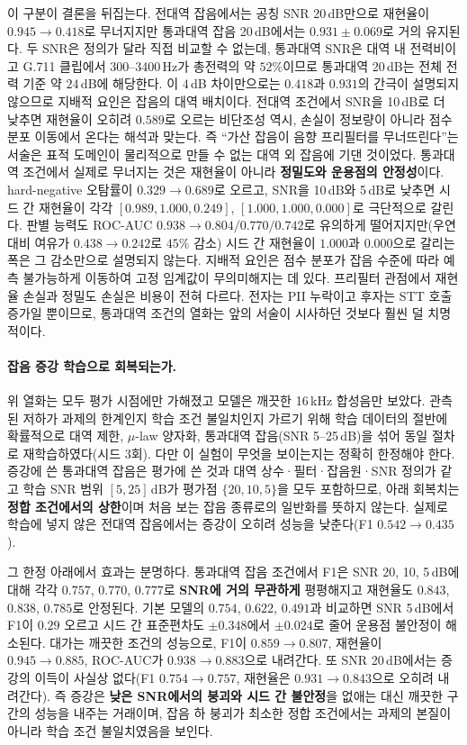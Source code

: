 \documentclass[10pt,twocolumn]{article}
\renewcommand{\emph}[1]{\textbf{#1}}
\begin{document}
이 구분이 결론을 뒤집는다. 전대역 잡음에서는 공칭 SNR 20\,dB만으로 재현율이 $0.945\to0.418$로
무너지지만 통과대역 잡음 20\,dB에서는 $0.931\pm0.069$로 거의 유지된다. 두 SNR은 정의가 달라 직접
비교할 수 없는데, 통과대역 SNR은 대역 내 전력비이고 G.711 클립에서 300--3400\,Hz가 총전력의 약
$52\%$이므로 통과대역 20\,dB는 전체 전력 기준 약 $24$\,dB에 해당한다. 이 $4$\,dB 차이만으로는
$0.418$과 $0.931$의 간극이 설명되지 않으므로 지배적 요인은 잡음의 대역 배치이다. 전대역
조건에서 SNR을 10\,dB로 더 낮추면 재현율이 오히려 $0.589$로 오르는 비단조성 역시, 손실이 정보량이
아니라 점수 분포 이동에서 온다는 해석과 맞는다. 즉 ``가산 잡음이 음향 프리필터를 무너뜨린다''는
서술은 표적 도메인이 물리적으로 만들 수 없는 대역 외 잡음에 기댄 것이었다. 통과대역 조건에서
실제로 무너지는 것은 재현율이 아니라 \emph{정밀도와 운용점의 안정성}이다. hard-negative
오탐률이 $0.329\to0.689$로 오르고, SNR을 10\,dB와 5\,dB로 낮추면 시드 간 재현율이 각각
$[0.989, 1.000, 0.249]$, $[1.000, 1.000, 0.000]$로 극단적으로 갈린다. 판별 능력도 ROC-AUC
$0.938\to0.804/0.770/0.742$로 유의하게 떨어지지만(우연 대비 여유가 $0.438\to0.242$로 $45\%$
감소) 시드 간 재현율이 $1.000$과 $0.000$으로 갈리는 폭은 그 감소만으로 설명되지 않는다. 지배적
요인은 점수 분포가 잡음 수준에 따라 예측 불가능하게 이동하여 고정 임계값이 무의미해지는 데
있다. 프리필터 관점에서 재현율 손실과 정밀도 손실은 비용이 전혀 다르다. 전자는 PII 누락이고
후자는 STT 호출 증가일 뿐이므로, 통과대역 조건의 열화는 앞의 서술이 시사하던 것보다 훨씬 덜
치명적이다.

\paragraph{잡음 증강 학습으로 회복되는가.}
위 열화는 모두 평가 시점에만 가해졌고 모델은 깨끗한 16\,kHz 합성음만 보았다. 관측된 저하가 과제의
한계인지 학습 조건 불일치인지 가르기 위해 학습 데이터의 절반에 확률적으로 대역 제한, $\mu$-law
양자화, 통과대역 잡음(SNR 5--25\,dB)을 섞어 동일 절차로 재학습하였다(시드 3회). 다만 이 실험이
무엇을 보이는지는 정확히 한정해야 한다. 증강에 쓴 통과대역 잡음은 평가에 쓴 것과 대역
상수·필터·잡음원·SNR 정의가 같고 학습 SNR 범위 $[5, 25]$\,dB가 평가점 $\{20, 10, 5\}$을 모두
포함하므로, 아래 회복치는 \emph{정합 조건에서의 상한}이며 처음 보는 잡음 종류로의 일반화를
뜻하지 않는다. 실제로 학습에 넣지 않은 전대역 잡음에서는 증강이 오히려 성능을 낮춘다(F1
$0.542\to0.435$).

그 한정 아래에서 효과는 분명하다. 통과대역 잡음 조건에서 F1은 SNR 20, 10, 5\,dB에 대해 각각
$0.757$, $0.770$, $0.777$로 \emph{SNR에 거의 무관하게} 평평해지고 재현율도 $0.843$, $0.838$,
$0.785$로 안정된다. 기본 모델의 $0.754$, $0.622$, $0.491$과 비교하면 SNR 5\,dB에서 F1이 $0.29$
오르고 시드 간 표준편차도 $\pm0.348$에서 $\pm0.024$로 줄어 운용점 불안정이 해소된다. 대가는
깨끗한 조건의 성능으로, F1이 $0.859\to0.807$, 재현율이 $0.945\to0.885$, ROC-AUC가
$0.938\to0.883$으로 내려간다. 또 SNR 20\,dB에서는 증강의 이득이 사실상 없다(F1
$0.754\to0.757$, 재현율은 $0.931\to0.843$으로 오히려 내려간다). 즉 증강은 \emph{낮은 SNR에서의
붕괴와 시드 간 불안정}을 없애는 대신 깨끗한 구간의 성능을 내주는 거래이며, 잡음 하 붕괴가 최소한
정합 조건에서는 과제의 본질이 아니라 학습 조건 불일치였음을 보인다.
\end{document}
